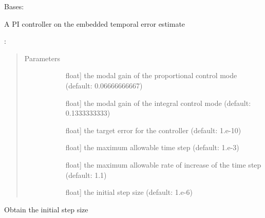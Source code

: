 \documentclass[letterpaper,10pt,english]{sphinxmanual}
\begin{document}
\begin{fulllineitems}
\label{\detokenize{spitfire.time.stepcontrol:spitfire.time.stepcontrol.PIController}}
Bases: 

A PI controller on the embedded temporal error estimate

:
\begin{quote}\begin{description}
\item[{Parameters}] \leavevmode\begin{description}
\item[{}] \leavevmode{[}float{]}
the modal gain of the proportional control mode (default: 0.06666666667)

\item[{}] \leavevmode{[}float{]}
the modal gain of the integral control mode (default: 0.1333333333)

\item[{}] \leavevmode{[}float{]}
the target error for the controller (default: 1.e-10)

\item[{}] \leavevmode{[}float{]}
the maximum allowable time step (default: 1.e-3)

\item[{}] \leavevmode{[}float{]}
the maximum allowable rate of increase of the time step (default: 1.1)

\item[{}] \leavevmode{[}float{]}
the initial step size (default: 1.e-6)

\end{description}

\end{description}\end{quote}

\begin{fulllineitems}
\label{\detokenize{spitfire.time.stepcontrol:spitfire.time.stepcontrol.PIController.first_step_size}}
Obtain the initial step size


\end{fulllineitems}
\end{fulllineitems}
\end{document}
